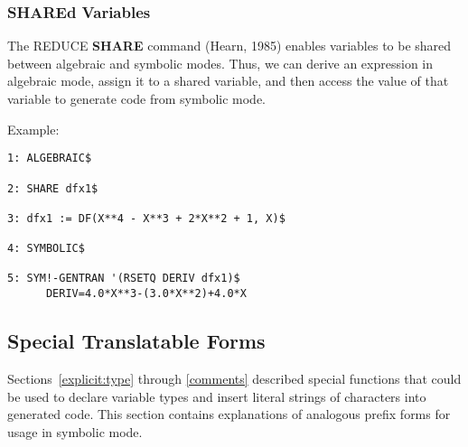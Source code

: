 \subsubsection{SHAREd Variables}
\label{share}
The REDUCE {\bf SHARE} command (Hearn, 1985) enables variables to be shared
between algebraic and symbolic modes.  Thus, we can derive an expression in
algebraic mode, assign it to a shared variable, and then access the value
of that variable to generate code from symbolic mode.

\begin{describe}{Example:}
\begin{verbatim}
1: ALGEBRAIC$

2: SHARE dfx1$

3: dfx1 := DF(X**4 - X**3 + 2*X**2 + 1, X)$

4: SYMBOLIC$

5: SYM!-GENTRAN '(RSETQ DERIV dfx1)$
      DERIV=4.0*X**3-(3.0*X**2)+4.0*X
\end{verbatim}
\end{describe} 

\subsection{Special Translatable Forms}
\label{special}
Sections~\ref{explicit:type} through \ref{comments}
described special functions that could be used to
declare variable types and insert literal strings of characters into generated
code.  This section contains explanations of analogous prefix forms for usage
in symbolic mode.

